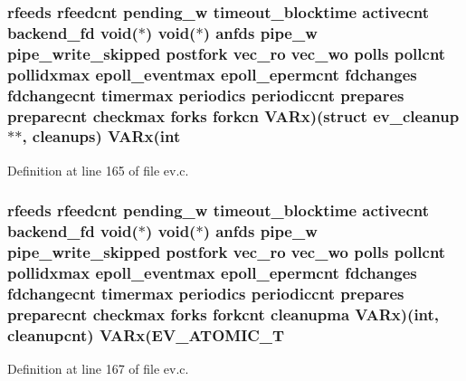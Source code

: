 \hypertarget{structev__loop_a56e34cf699004a36e5f073ed9bab52eb}{
\subsubsection[{\-V\-A\-Rx}]{ {\bf rfeeds} {\bf rfeedcnt} {\bf pending\-\_\-w} {\bf timeout\-\_\-blocktime} {\bf activecnt} {\bf backend\-\_\-fd} void($\ast$) void($\ast$) {\bf anfds} {\bf pipe\-\_\-w} {\bf pipe\-\_\-write\-\_\-skipped} {\bf postfork} {\bf vec\-\_\-ro} {\bf vec\-\_\-wo} {\bf polls} {\bf pollcnt} {\bf pollidxmax} {\bf epoll\-\_\-eventmax} {\bf epoll\-\_\-epermcnt} {\bf fdchanges} {\bf fdchangecnt} {\bf timermax} {\bf periodics} {\bf periodiccnt} {\bf prepares} {\bf preparecnt} {\bf checkmax} {\bf forks} forkcn {\bf \-V\-A\-Rx})(struct {\bf ev\-\_\-cleanup} $\ast$$\ast$, {\bf cleanups}) {\bf \-V\-A\-Rx}(int}}\label{structev__loop_a56e34cf699004a36e5f073ed9bab52eb}


\-Definition at line 165 of file ev.\-c.

\hypertarget{structev__loop_a8982b5b62a94b67e5d1cd0d13348423d}{
\subsubsection[{\-V\-A\-Rx}]{ {\bf rfeeds} {\bf rfeedcnt} {\bf pending\-\_\-w} {\bf timeout\-\_\-blocktime} {\bf activecnt} {\bf backend\-\_\-fd} void($\ast$) void($\ast$) {\bf anfds} {\bf pipe\-\_\-w} {\bf pipe\-\_\-write\-\_\-skipped} {\bf postfork} {\bf vec\-\_\-ro} {\bf vec\-\_\-wo} {\bf polls} {\bf pollcnt} {\bf pollidxmax} {\bf epoll\-\_\-eventmax} {\bf epoll\-\_\-epermcnt} {\bf fdchanges} {\bf fdchangecnt} {\bf timermax} {\bf periodics} {\bf periodiccnt} {\bf prepares} {\bf preparecnt} {\bf checkmax} {\bf forks} {\bf forkcnt} cleanupma {\bf \-V\-A\-Rx})(int, {\bf cleanupcnt}) {\bf \-V\-A\-Rx}(\-E\-V\-\_\-\-A\-T\-O\-M\-I\-C\-\_\-\-T}}\label{structev__loop_a8982b5b62a94b67e5d1cd0d13348423d}


\-Definition at line 167 of file ev.\-c.

